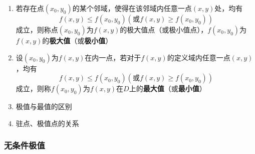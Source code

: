 \documentclass[../book.tex]{subfiles}
\begin{document}
    \begin{enumerate}
        \item 若存在点$(x_0, y_0)$的某个邻域，使得在该邻域内任意一点$(x, y)$处，均有
        \[
            f(x, y) \leq f(x_0, y_0)(\text{或}f(x, y) \geq f(x_0, y_0))
        \]
        成立，则称点$(x_0, y_0)$为$f(x, y)$的极大值点（或极小值点），$f(x_0, y_0)$为$f(x, y)$的\textbf{极大值}（或\textbf{极小值}）

        \item 设$(x_0, y_0)$为$f(x, y)${}在内一点，若对于$f(x, y)$的定义域内任意一点$(x, y)$，均有
        \[
            f(x, y) \leq f(x_0, y_0)(\text{或}f(x, y) \geq f(x_0, y_0))
        \]
        成立，则称$f(x_0, y_0)$为$f(x, y)$在$D$上的\textbf{最大值}（或\textbf{最小值}）

        \item 极值与最值的区别
        \item 驻点、极值点的关系

    \end{enumerate}

    \subsubsection{无条件极值}
\end{document}
